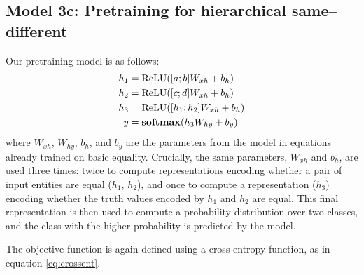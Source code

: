 \subsection{Model 3c: Pretraining for hierarchical same--different}\label{sec:model3b}

Our pretraining model is as follows:
%
\begin{align}
  h_1 &= \operatorname{ReLU}([a;b]W_{xh} + b_{h}) \label{eq:preh1-supp}\\
  h_2 &= \operatorname{ReLU}([c;d]W_{xh} + b_{h})\\
  h_3 &= \operatorname{ReLU}([h_1;h_2]W_{xh} + b_{h}) \\
  y &= \mathbf{softmax}(h_3W_{hy} + b_{y}) \label{eq:prey-supp}\
\end{align}
%
where $W_{xh}$, $W_{hy}$, $b_h$, and $b_y$ are the parameters from the model in equations  already trained on basic equality. Crucially, the same parameters, $W_{xh}$ and $b_h$, are used three times: twice to compute representations encoding whether a pair of input entities are equal ($h_1$, $h_2$), and once to compute a representation ($h_{3}$) encoding whether the truth values encoded by $h_1$ and $h_2$ are equal. This final representation is then used to compute a probability distribution over two classes, and the class with the higher probability is predicted by the model.

The objective function is again defined using a cross entropy function, as in equation \ref{eq:crossent}.

